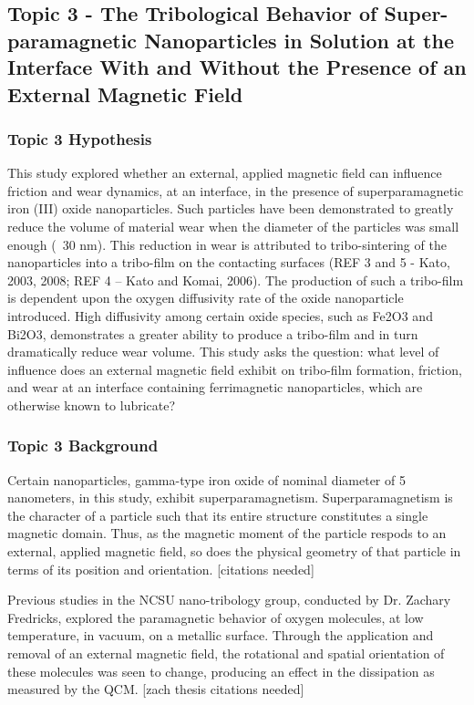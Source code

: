 \subsection{Topic 3 - The Tribological Behavior of Super-paramagnetic Nanoparticles in Solution at the Interface With and Without the Presence of an External Magnetic Field}


\subsubsection{Topic 3 Hypothesis}

This study explored whether an external, applied magnetic field can influence friction and wear dynamics, at an interface, in the presence of superparamagnetic iron (III) oxide nanoparticles. Such particles have been demonstrated to greatly reduce the volume of material wear when the diameter of the particles was small enough (~30 nm). This reduction in wear is attributed to tribo-sintering of the nanoparticles into a tribo-film on the contacting surfaces (REF 3 and 5  - Kato, 2003, 2008; REF 4 – Kato and Komai, 2006). The production of such a tribo-film is dependent upon the oxygen diffusivity rate of the oxide nanoparticle introduced. High diffusivity among certain oxide species, such as Fe2O3 and Bi2O3, demonstrates a greater ability to produce a tribo-film and in turn dramatically reduce wear volume. This study asks the question: what level of  influence does an external magnetic field exhibit on tribo-film formation, friction, and wear at an interface containing ferrimagnetic nanoparticles, which are otherwise known to lubricate?


\subsubsection{Topic 3 Background}

Certain nanoparticles, gamma-type iron oxide of nominal diameter of 5 nanometers, in this study, exhibit superparamagnetism. Superparamagnetism is the character of a particle such that its entire structure constitutes a single magnetic domain. Thus, as the magnetic moment of the particle respods to an external, applied magnetic field, so does the physical geometry of that particle in terms of its position and orientation. [citations needed]

Previous studies in the NCSU nano-tribology group, conducted by Dr. Zachary Fredricks, explored the paramagnetic behavior of oxygen molecules, at low temperature, in vacuum, on a metallic surface. Through the application and removal of an external magnetic field, the rotational and spatial orientation of these molecules was seen to change, producing an effect in the dissipation as measured by the QCM. [zach thesis citations needed]

